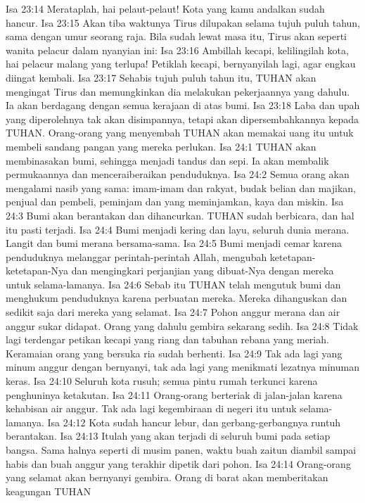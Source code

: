 Isa 23:14  Merataplah, hai pelaut-pelaut! Kota yang kamu andalkan sudah hancur.
Isa 23:15  Akan tiba waktunya Tirus dilupakan selama tujuh puluh tahun, sama dengan umur seorang raja. Bila sudah lewat masa itu, Tirus akan seperti wanita pelacur dalam nyanyian ini:
Isa 23:16  Ambillah kecapi, kelilingilah kota, hai pelacur malang yang terlupa! Petiklah kecapi, bernyanyilah lagi, agar engkau diingat kembali.
Isa 23:17  Sehabis tujuh puluh tahun itu, TUHAN akan mengingat Tirus dan memungkinkan dia melakukan pekerjaannya yang dahulu. Ia akan berdagang dengan semua kerajaan di atas bumi.
Isa 23:18  Laba dan upah yang diperolehnya tak akan disimpannya, tetapi akan dipersembahkannya kepada TUHAN. Orang-orang yang menyembah TUHAN akan memakai uang itu untuk membeli sandang pangan yang mereka perlukan.
Isa 24:1  TUHAN akan membinasakan bumi, sehingga menjadi tandus dan sepi. Ia akan membalik permukaannya dan menceraiberaikan penduduknya.
Isa 24:2  Semua orang akan mengalami nasib yang sama: imam-imam dan rakyat, budak belian dan majikan, penjual dan pembeli, peminjam dan yang meminjamkan, kaya dan miskin.
Isa 24:3  Bumi akan berantakan dan dihancurkan. TUHAN sudah berbicara, dan hal itu pasti terjadi.
Isa 24:4  Bumi menjadi kering dan layu, seluruh dunia merana. Langit dan bumi merana bersama-sama.
Isa 24:5  Bumi menjadi cemar karena penduduknya melanggar perintah-perintah Allah, mengubah ketetapan-ketetapan-Nya dan mengingkari perjanjian yang dibuat-Nya dengan mereka untuk selama-lamanya.
Isa 24:6  Sebab itu TUHAN telah mengutuk bumi dan menghukum penduduknya karena perbuatan mereka. Mereka dihanguskan dan sedikit saja dari mereka yang selamat.
Isa 24:7  Pohon anggur merana dan air anggur sukar didapat. Orang yang dahulu gembira sekarang sedih.
Isa 24:8  Tidak lagi terdengar petikan kecapi yang riang dan tabuhan rebana yang meriah. Keramaian orang yang bersuka ria sudah berhenti.
Isa 24:9  Tak ada lagi yang minum anggur dengan bernyanyi, tak ada lagi yang menikmati lezatnya minuman keras.
Isa 24:10  Seluruh kota rusuh; semua pintu rumah terkunci karena penghuninya ketakutan.
Isa 24:11  Orang-orang berteriak di jalan-jalan karena kehabisan air anggur. Tak ada lagi kegembiraan di negeri itu untuk selama-lamanya.
Isa 24:12  Kota sudah hancur lebur, dan gerbang-gerbangnya runtuh berantakan.
Isa 24:13  Itulah yang akan terjadi di seluruh bumi pada setiap bangsa. Sama halnya seperti di musim panen, waktu buah zaitun diambil sampai habis dan buah anggur yang terakhir dipetik dari pohon.
Isa 24:14  Orang-orang yang selamat akan bernyanyi gembira. Orang di barat akan memberitakan keagungan TUHAN
